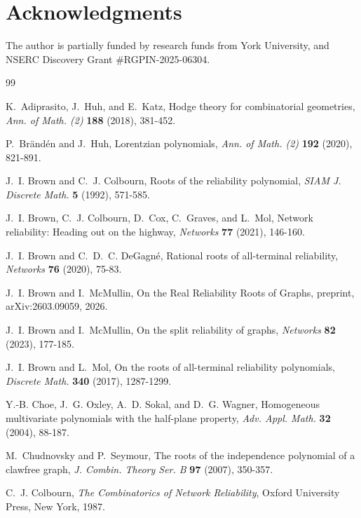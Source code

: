 \documentclass[12pt]{amsart}
\theoremstyle{definition}
\begin{document}
\section*{Acknowledgments}
The author is partially funded by research funds from York University, and NSERC Discovery Grant \#RGPIN-2025-06304.

\begin{thebibliography}{99}


K.~Adiprasito, J.~Huh, and E.~Katz,
Hodge theory for combinatorial geometries,
\emph{Ann. of Math. (2)} \textbf{188} (2018), 381-452.

P.~Br\"and\'en and J.~Huh,
Lorentzian polynomials,
\emph{Ann. of Math. (2)} \textbf{192} (2020), 821-891.

J.~I. Brown and C.~J. Colbourn,
Roots of the reliability polynomial,
\emph{SIAM J. Discrete Math.} \textbf{5} (1992), 571-585.

J.~I. Brown, C.~J. Colbourn, D.~Cox, C.~Graves, and L.~Mol,
Network reliability: Heading out on the highway,
\emph{Networks} \textbf{77} (2021), 146-160.

J.~I. Brown and C.~D.~C. DeGagn\'e,
Rational roots of all-terminal reliability,
\emph{Networks} \textbf{76} (2020), 75-83.

J.~I. Brown and I.~McMullin,
On the Real Reliability Roots of Graphs,
preprint, arXiv:2603.09059, 2026.

J.~I. Brown and I.~McMullin,
On the split reliability of graphs,
\emph{Networks} \textbf{82} (2023), 177-185.

J.~I. Brown and L.~Mol,
On the roots of all-terminal reliability polynomials,
\emph{Discrete Math.} \textbf{340} (2017), 1287-1299.

Y.-B. Choe, J.~G. Oxley, A.~D. Sokal, and D.~G. Wagner,
Homogeneous multivariate polynomials with the half-plane property,
\emph{Adv. Appl. Math.} \textbf{32} (2004), 88-187.

M.~Chudnovsky and P.~Seymour,
The roots of the independence polynomial of a clawfree graph,
\emph{J. Combin. Theory Ser. B} \textbf{97} (2007), 350-357.

C.~J. Colbourn,
\emph{The Combinatorics of Network Reliability},
Oxford University Press, New York, 1987.


\end{thebibliography}
\end{document}
